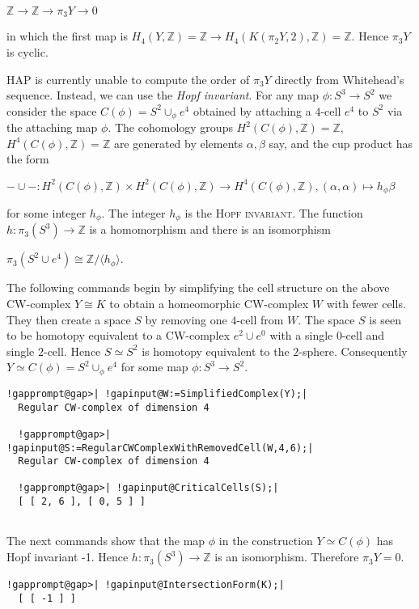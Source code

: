 \documentclass[a4paper,11pt]{report}
\begin{document}
{{{$\mathbb Z \rightarrow \mathbb Z \rightarrow \pi_3Y \rightarrow 0$ 

in which the first map is $ H_4(Y,\mathbb Z)=\mathbb Z \rightarrow H_4(K(\pi_2Y,2), \mathbb Z )=\mathbb Z $. Hence $\pi_3Y$ is cyclic. 

 HAP is currently unable to compute the order of $\pi_3Y$ directly from Whitehead's sequence. Instead, we can use the \emph{Hopf invariant}. For any map $\phi\colon S^3 \rightarrow S^2$ we consider the space $C(\phi) = S^2 \cup_\phi e^4$ obtained by attaching a $4$-cell $e^4$ to $S^2$ via the attaching map $\phi$. The cohomology groups $H^2(C(\phi),\mathbb Z)=\mathbb Z$, $H^4(C(\phi),\mathbb Z)=\mathbb Z$ are generated by elements $\alpha, \beta$ say, and the cup product has the form 

$- \cup -\colon H^2(C(\phi),\mathbb Z)\times H^2(C(\phi),\mathbb Z) \rightarrow
H^4(C(\phi),\mathbb Z), (\alpha,\alpha) \mapsto h_\phi \beta$ 

for some integer $h_\phi$. The integer $h_\phi$ is the \textsc{Hopf invariant}. The function $h\colon \pi_3(S^3)\rightarrow \mathbb Z$ is a homomorphism and there is an isomorphism 

$\pi_3(S^2\cup e^4) \cong \mathbb Z/\langle h_\phi\rangle$. 

The following commands begin by simplifying the cell structure on the above
CW-complex $Y\cong K$ to obtain a homeomorphic CW-complex $W$ with fewer cells. They then create a space $S$ by removing one $4$-cell from $W$. The space $S$ is seen to be homotopy equivalent to a CW-complex $e^2\cup e^0$ with a single $0$-cell and single $2$-cell. Hence $S\simeq S^2$ is homotopy equivalent to the $2$-sphere. Consequently $Y \simeq C(\phi ) = S^2\cup_\phi e^4 $ for some map $\phi\colon S^3 \rightarrow S^2$. 
\begin{Verbatim}[commandchars=!@|,fontsize=\small,frame=single,label=Example]
  !gapprompt@gap>| !gapinput@W:=SimplifiedComplex(Y);|
  Regular CW-complex of dimension 4
  
  !gapprompt@gap>| !gapinput@S:=RegularCWComplexWithRemovedCell(W,4,6);|
  Regular CW-complex of dimension 4
  
  !gapprompt@gap>| !gapinput@CriticalCells(S);|
  [ [ 2, 6 ], [ 0, 5 ] ]
  
\end{Verbatim}
 

 The next commands show that the map $\phi$ in the construction $Y \simeq C(\phi) $ has Hopf invariant -1. Hence $h\colon \pi_3(S^3)\rightarrow \mathbb Z$ is an isomorphism. Therefore $\pi_3Y=0$. 
\begin{Verbatim}[commandchars=!@|,fontsize=\small,frame=single,label=Example]
  !gapprompt@gap>| !gapinput@IntersectionForm(K);|
  [ [ -1 ] ]
  

\end{Verbatim}}}}
\end{document}
